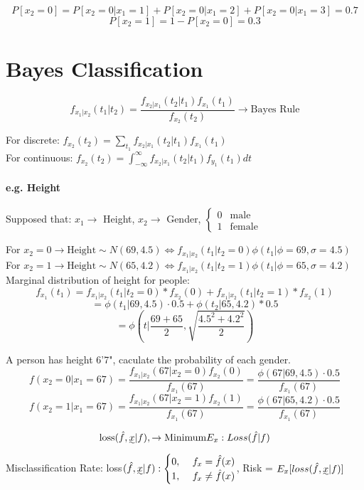 \documentclass{article}
\begin{document}
{{{            \[P[x_2= 0] = P[x_2=0 \vert x_1=1]+P[x_2=0 \vert x_1=2]+P[x_2=0 \vert x_1=3]=0.7\]
            \[P[x_2= 1] = 1 - P[x_2= 0] = 0.3\]
        }
    }
}

\section{Bayes Classification}{
    \[f_{x_1|x_2}(t_1|t_2)=\frac{f_{x_2|x_1}(t_2|t_1)f_{x_1}(t_1)}{f_{x_2}(t_2)} \rightarrow \text{Bayes Rule}\]

    For discrete: \(f_{x_2}(t_2)= \sum_{t_1}f_{x_2|x_1}(t_2|t_1)f_{x_1}(t_1)\)\\

    For continuous: \(f_{x_2}(t_2)= \int_{-\infty}^{\infty}f_{x_2|x_1}(t_2|t_1)f_{y_1}(t_1)dt\)

    \paragraph{e.g. Height}{
        Supposed that: $x_1 \rightarrow$ Height, $x_2 \rightarrow$ Gender,
        \(\begin{cases} 0  & \text{male} \\ 
        1& \text{female} \end{cases}\)

        For \(x_2= 0 \rightarrow \text{Height} \sim N(69,4.5) \Leftrightarrow f_{x_1|x_2}(t_1|t_2= 0)\phi( t_1|\phi=69, \sigma= 4.5)\)\\

        For \(x_2= 1 \rightarrow \text{Height} \sim N(65,4.2)\Leftrightarrow f_{x_1|x_2}(t_1|t_2= 1)\phi( t_1|\phi=65, \sigma= 4.2)\)\\
            
        Marginal distribution of height for people:
        \[f_{x_1}(t_1)=f_{x_1|x_2}(t_1|t_2= 0)*f_{x_2}(0)+f_{x_1|x_2}(t_1|t_2= 1)*f_{x_2}(1)\]
        \[= \phi(t_1|69, 4.5)\cdot 0.5+\phi(t_2|65, 4.2)*0.5\]
        \[= \phi(t|\frac{69+65}{2},\sqrt{\frac{4.5^2+4.2^2}{2}} )\]

        A person has height 6'7", caculate the probability of each gender.
        \[f(x_2= 0| x_1=67)=\frac{ f_{x_1|x_2}(67|x_2= 0)f_{x_2}(0)}{f_{x_1}(67)}=\frac{\phi(67|69,4.5)\cdot 0.5}{f_{x_1}(67)}\]
        \[f(x_2= 1| x_1=67)=\frac{ f_{x_1|x_2}(67|x_2= 1)f_{x_2}(1)}{f_{x_1}(67)}=\frac{\phi(67|65,4.2)\cdot 0.5}{f_{x_1}(67)}\]
    } 

    \[\text{loss}(\hat{f}, \uwave{x}|f), \rightarrow \text{Minimum} E_x: Loss (\hat{f}|f)\]
    Misclassification Rate: loss\((\hat{f}, \uwave{x}|f): \begin{cases} 
        0, &\  f_x=\hat{f}(x) \\ 
        1, &\  f_x \ne \hat{f}(x) 
    \end{cases}\), Risk = \(E_x[loss(\hat{f}, \uwave{x}|f)]\)\\

}
\end{document}
